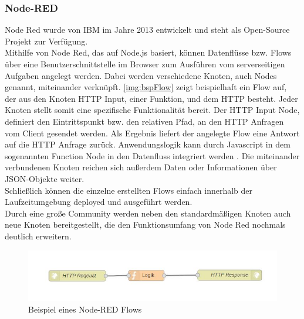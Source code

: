 \subsubsection{Node-RED}
Node Red wurde von IBM im Jahre 2013 entwickelt und steht als Open-Source Projekt zur Verfügung\cite{nodeRed:nodeRedAbout}.\\
Mithilfe von Node Red, das auf Node.js basiert, können Datenflüsse bzw. Flows über eine Benutzerschnittstelle im Browser zum Ausführen vom serverseitigen Aufgaben angelegt werden. Dabei werden verschiedene Knoten, auch Nodes genannt, miteinander verknüpft. \autoref{img:bspFlow} zeigt beispielhaft ein Flow auf, der aus den Knoten \acf{HTTP} Input, einer Funktion, und dem \ac{HTTP} besteht. Jeder Knoten stellt somit eine spezifische Funktionalität bereit. Der \ac{HTTP} Input Node, definiert den Eintrittspunkt bzw. den relativen Pfad, an den \ac{HTTP} Anfragen vom Client gesendet werden. Als Ergebnis liefert der angelegte Flow eine Antwort auf die \ac{HTTP} Anfrage zurück. Anwendungslogik kann durch Javascript in dem sogenannten Function Node in den Datenfluss integriert werden . Die miteinander verbundenen Knoten reichen sich außerdem Daten oder Informationen über \ac{JSON}-Objekte weiter.
\\Schließlich können die einzelne erstellten Flows einfach innerhalb der Laufzeitumgebung deployed und ausgeführt werden. \\Durch eine große Community werden neben den standardmäßigen Knoten auch neue Knoten bereitgestellt, die den Funktionsumfang von Node Red nochmals deutlich erweitern\cite{nodeRed:nodeRed}.
\begin{figure}[H]
	\centering	
	\includegraphics[scale=0.8]{images/bspFlow}
	\caption{Beispiel eines Node-RED Flows}
	\label{img:bspFlow}
\end{figure}




